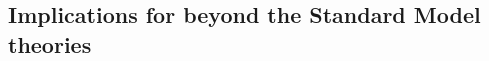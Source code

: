 \documentclass[../report.tex]{subfiles}
\providecommand{\main}{..}
\begin{document}
%



\subsection{Implications for beyond the Standard Model theories}


\end{document}
